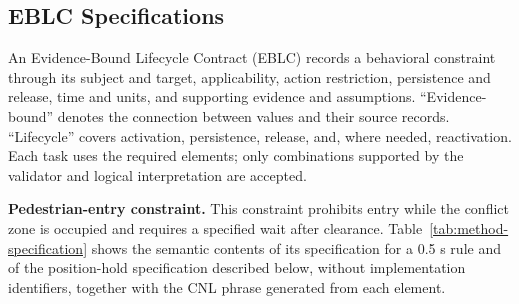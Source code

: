 \subsection{EBLC Specifications}\label{sec:method-eblc}

An Evidence-Bound Lifecycle Contract (EBLC) records a behavioral constraint
through its subject and target, applicability, action restriction, persistence
and release, time and units, and supporting evidence and assumptions.
``Evidence-bound'' denotes the connection between values and their source
records. ``Lifecycle'' covers activation, persistence, release, and, where
needed, reactivation. Each task uses the required elements; only combinations
supported by the validator and logical interpretation are accepted.

\noindent\textbf{Pedestrian-entry constraint.}
This constraint prohibits entry while the conflict zone is occupied and
requires a specified wait after clearance. Table~\ref{tab:method-specification}
shows the semantic contents of its specification for a 0.5 s rule and of the
position-hold specification described below, without
implementation identifiers, together with the CNL phrase generated from each
element.


